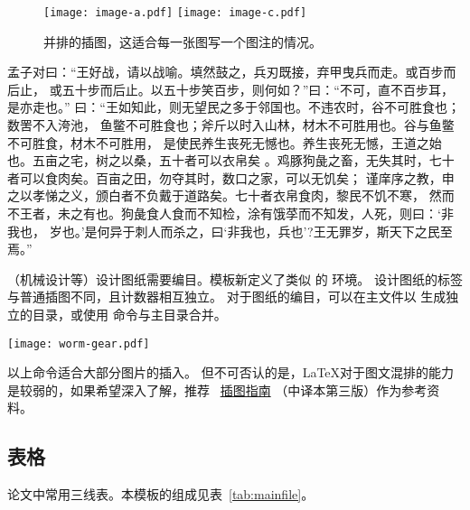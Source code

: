 \begin{figure}[htbp]
	\centering
	{\texttt{[image: image-a.pdf]}}
	\hspace{1cm}
	{\texttt{[image: image-c.pdf]}}
	\caption{并排的插图，这适合每一张图写一个图注的情况。}\label{fig:abreast-image-a-c}
\end{figure}

孟子对曰：“王好战，请以战喻。填然鼓之，兵刃既接，弃甲曳兵而走。或百步而后止，
或五十步而后止。以五十步笑百步，则何如？”曰：“不可，直不百步耳，是亦走也。”
曰：“王如知此，则无望民之多于邻国也。不违农时，谷不可胜食也；数罟不入洿池，
鱼鳖不可胜食也；斧斤以时入山林，材木不可胜用也。谷与鱼鳖不可胜食，材木不可胜用，
是使民养生丧死无憾也。养生丧死无憾，王道之始也。五亩之宅，树之以桑，五十者可以衣帛矣
。鸡豚狗彘之畜，无失其时，七十者可以食肉矣。百亩之田，勿夺其时，数口之家，可以无饥矣；
谨庠序之教，申之以孝悌之义，颁白者不负戴于道路矣。七十者衣帛食肉，黎民不饥不寒，
然而不王者，未之有也。狗彘食人食而不知检，涂有饿莩而不知发，人死，则曰：‘非我也，
岁也。’是何异于刺人而杀之，曰‘非我也，兵也’?王无罪岁，斯天下之民至焉。”

（机械设计等）设计图纸需要编目。模板新定义了类似  的 环境。
设计图纸的标签与普通插图不同，且计数器相互独立。
对于图纸的编目，可以在主文件以  生成独立的目录，或使用
命令与主目录合并。
\begin{dfigure}%
	\centering
	\texttt{[image: worm-gear.pdf]}
	\caption{设计图纸示例}  %
\end{dfigure}

以上命令适合大部分图片的插入。
但不可否认的是，\LaTeX{}对于图文混排的能力是较弱的，如果希望深入了解，推荐~
\href{https://github.com/WenboSheng/epslatex-cn}{\LaTeXe 插图指南}
（中译本第三版）作为参考资料。


\subsection{表格}\label{subsec:tab}
论文中常用三线表。本模板的组成见表~\ref{tab:mainfile}。

